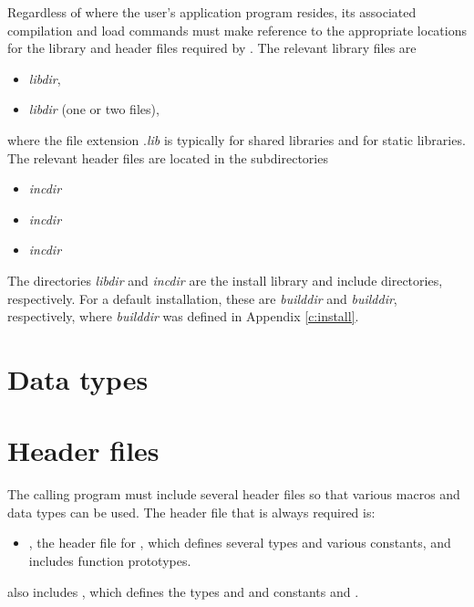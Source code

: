 Regardless of where the user's application program resides, its
associated compilation and load commands must make reference to the
appropriate locations for the library and header files required by
{\kinsol}.  The relevant library files are
\begin{itemize}
\item {\em libdir},
\item {\em libdir} (one or two files),
\end{itemize}
where the file extension .{\em lib} is typically  for shared libraries
and  for static libraries. The relevant header files are located in
the subdirectories
\begin{itemize}
\item {\em incdir}
\item {\em incdir}
\item {\em incdir}
\end{itemize}
The directories {\em libdir} and {\em incdir} are the install library
and include directories, respectively.  For a default installation,
these are {\em builddir} and {\em builddir},
respectively, where {\em builddir} was defined in Appendix \ref{c:install}.

\section{Data types}\label{s:types}


\section{Header files}\label{s:header_sol}
The calling program must include several header files so that various macros
and data types can be used. The header file that is always required is:
%
\begin{itemize}
\item  {}, 
  the header file for {\kinsol}, which defines several
  types and various constants, and includes function prototypes.
\end{itemize}
%
 also includes , 
which defines the types  and 
and constants  and .


